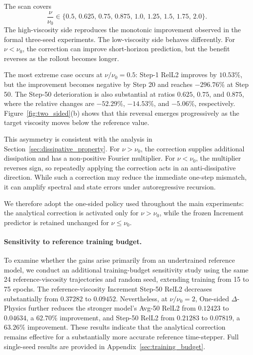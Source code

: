 \documentclass[10pt,twocolumn]{article}
\begin{document}
The scan covers
\begin{equation}
    \frac{\nu}{\nu_0}
    \in
    \{
    0.5,\,
    0.625,\,
    0.75,\,
    0.875,\,
    1.0,\,
    1.25,\,
    1.5,\,
    1.75,\,
    2.0
    \}.
\end{equation}
The high-viscosity side reproduces the monotonic improvement observed in the
formal three-seed experiments. The low-viscosity side behaves differently.
For $\nu<\nu_0$, the correction can improve short-horizon prediction, but the
benefit reverses as the rollout becomes longer.

The most extreme case occurs at $\nu/\nu_0=0.5$: Step-1 RelL2 improves by
$10.53\%$, but the improvement becomes negative by Step 20 and reaches
$-296.76\%$ at Step 50. The Step-50 deterioration is also substantial at
ratios $0.625$, $0.75$, and $0.875$, where the relative changes are
$-52.29\%$, $-14.53\%$, and $-5.06\%$, respectively.
Figure~\ref{fig:two_sided}(b) shows that this reversal emerges progressively
as the target viscosity moves below the reference value.

This asymmetry is consistent with the analysis in
Section~\ref{sec:dissipative_property}. For $\nu>\nu_0$, the correction
supplies additional dissipation and has a non-positive Fourier multiplier.
For $\nu<\nu_0$, the multiplier reverses sign, so repeatedly applying the
correction acts in an anti-dissipative direction. While such a correction may
reduce the immediate one-step mismatch, it can amplify spectral and state
errors under autoregressive recursion.

We therefore adopt the one-sided policy used throughout the main experiments:
the analytical correction is activated only for $\nu>\nu_0$, while the
frozen Increment predictor is retained unchanged for $\nu\le\nu_0$.


\paragraph{Sensitivity to reference training budget.}
To examine whether the gains arise primarily from an
undertrained reference model, we conduct an additional
training-budget sensitivity study using the same 24
reference-viscosity trajectories and random seed, extending
training from 15 to 75 epochs. The reference-viscosity
Increment Step-50 RelL2 decreases substantially from
$0.37282$ to $0.09452$. Nevertheless, at
$\nu/\nu_0=2$, One-sided $\Delta$-Physics further reduces
the stronger model's Avg-50 RelL2 from $0.12423$ to
$0.04634$, a $62.70\%$ improvement, and Step-50 RelL2
from $0.21283$ to $0.07819$, a $63.26\%$
improvement. These results indicate that the analytical
correction remains effective for a substantially more
accurate reference time-stepper. Full single-seed
results are provided in Appendix~\ref{sec:training_budget}.
\end{document}
